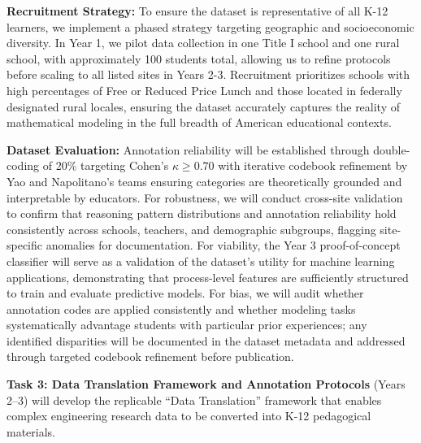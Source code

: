 \documentclass[11pt]{article}
\begin{document}
\textbf{Recruitment Strategy:}
To ensure the dataset is representative of all K-12 learners, we implement a phased strategy targeting geographic and socioeconomic diversity.
In Year 1, we pilot data collection in one Title I school and one rural school, with approximately 100 students total, allowing us to refine protocols before scaling to all listed sites in Years 2-3.
Recruitment prioritizes schools with high percentages of Free or Reduced Price Lunch and those located in federally designated rural locales, ensuring the dataset accurately captures the reality of mathematical modeling in the full breadth of American educational contexts.

\textbf{Dataset Evaluation:}
Annotation reliability will be established through double-coding of 20\% targeting Cohen's $\kappa \geq 0.70$  with iterative codebook refinement by Yao and Napolitano's teams ensuring categories are theoretically grounded and interpretable by educators. For robustness, we will conduct cross-site validation to confirm that reasoning pattern distributions and annotation reliability hold consistently across schools, teachers, and demographic subgroups, flagging site-specific anomalies for documentation. For viability, the Year 3 proof-of-concept classifier will serve as a validation of the dataset's utility for machine learning applications, demonstrating that process-level features are sufficiently structured to train and evaluate predictive models. For bias, we will audit whether annotation codes are applied consistently and whether modeling tasks systematically advantage students with particular prior experiences; any identified disparities will be documented in the dataset metadata and addressed through targeted codebook refinement before publication.

\vspace{-0.2cm}
\begin{tcolorbox}[colback=mycmykcolor, colframe=black, boxrule=1pt, coltext=black]
\vspace{-0.2cm}
\textbf{Task 3: Data Translation Framework and Annotation Protocols}
(Years 2–3) will develop the replicable ``Data Translation'' framework that enables complex engineering research data to be converted into K-12 pedagogical materials.
\vspace{-0.2cm}
\end{tcolorbox}
\vspace{-0.1cm}
\end{document}
